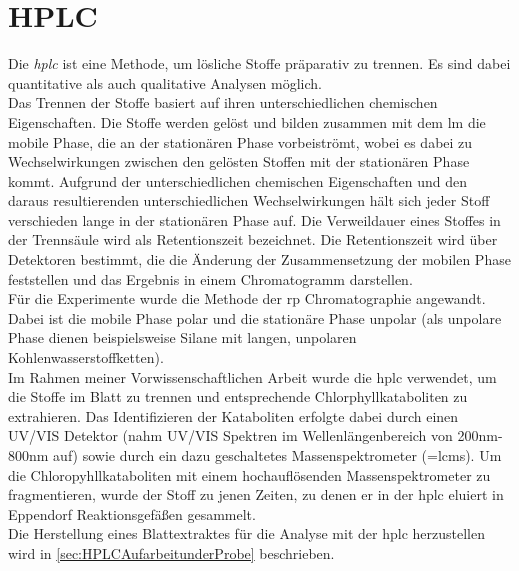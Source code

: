 \section{HPLC}

Die \textit{\gls{hplc}} ist eine Methode, um lösliche Stoffe präparativ zu trennen. Es sind dabei quantitative als auch qualitative Analysen möglich. \cite[S. 165]{Chromatographie} \\

Das Trennen der Stoffe basiert auf ihren unterschiedlichen chemischen Eigenschaften. Die Stoffe werden gelöst und bilden zusammen mit dem  \gls{lm} die mobile Phase, die an der stationären Phase vorbeiströmt, wobei es dabei zu Wechselwirkungen zwischen den gelösten Stoffen mit der stationären Phase kommt. Aufgrund der unterschiedlichen chemischen Eigenschaften und den daraus resultierenden unterschiedlichen Wechselwirkungen hält sich jeder Stoff verschieden lange in der stationären Phase auf. Die Verweildauer eines Stoffes in der Trennsäule wird als Retentionszeit bezeichnet. \cite[S. 31-32]{Chromatographie} Die Retentionszeit wird über Detektoren bestimmt, die die Änderung der Zusammensetzung der mobilen Phase feststellen und das Ergebnis in einem Chromatogramm darstellen.  \cite[S. 46]{Chromatographie} \\

Für die Experimente wurde die Methode der \gls{rp} Chromatographie angewandt. Dabei ist die mobile Phase polar und die stationäre Phase unpolar (als unpolare Phase dienen beispielsweise Silane mit langen, unpolaren Kohlenwasserstoffketten). \cite[S. 189]{Chromatographie}\\

Im Rahmen meiner Vorwissenschaftlichen Arbeit wurde die \gls{hplc} verwendet, um die Stoffe im Blatt zu trennen und entsprechende Chlorphyllkataboliten zu extrahieren. Das Identifizieren der Kataboliten erfolgte dabei durch einen UV/VIS Detektor (nahm UV/VIS Spektren im Wellenlängenbereich von 200nm-800nm auf) sowie durch ein dazu geschaltetes Massenspektrometer (=\gls{lcms}). Um die Chloropyhllkataboliten mit einem hochauflösenden Massenspektrometer zu fragmentieren, wurde der Stoff zu jenen Zeiten, zu denen er in der \gls{hplc} eluiert in Eppendorf Reaktionsgefäßen gesammelt.\\

Die Herstellung eines Blattextraktes für die Analyse mit der \gls{hplc} herzustellen wird in \ref{sec:HPLCAufarbeitunderProbe}  beschrieben. 
